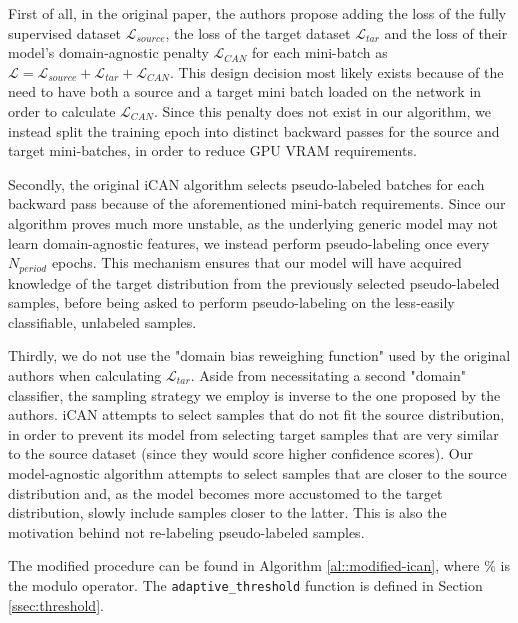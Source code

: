 \documentclass[12pt, a4paper]{article}
\newcommand{\loss}{\mathcal{L}}
\begin{document}
	First of all, in the original paper, the authors propose adding the loss of the fully supervised dataset $\loss_{source}$, the loss of the target dataset $\loss_{tar}$ and the loss of their model's domain-agnostic penalty $\loss_{CAN}$ for each mini-batch as $\loss = \loss_{source} + \loss_{tar} + \loss_{CAN}$. This design decision most likely exists because of the need to have both a source and a target mini batch loaded on the network in order to calculate $\loss_{CAN}$. Since this penalty does not exist in our algorithm, we instead split the training epoch into distinct backward passes for the source and target mini-batches, in order to reduce GPU VRAM requirements.
	
	Secondly, the original iCAN algorithm selects pseudo-labeled batches for each backward pass because of the aforementioned mini-batch requirements. Since our algorithm proves much more unstable, as the underlying generic model may not learn domain-agnostic features, we instead perform pseudo-labeling once every $N_{period}$ epochs. This mechanism ensures that our model will have acquired knowledge of the target distribution from the previously selected pseudo-labeled samples, before being asked to perform pseudo-labeling on the less-easily classifiable, unlabeled samples.
	
	Thirdly, we do not use the "domain bias reweighing function" used by the original authors when calculating $\loss_{tar}$. Aside from necessitating a second "domain" classifier, the sampling strategy we employ is inverse to the one proposed by the authors. iCAN attempts to select samples that do not fit the source distribution, in order to prevent its model from selecting target samples that are very similar to the source dataset (since they would score higher confidence scores). Our model-agnostic algorithm attempts to select samples that are closer to the source distribution and, as the model becomes more accustomed to the target distribution, slowly include samples closer to the latter. This is also the motivation behind not re-labeling pseudo-labeled samples.
		
	The modified procedure can be found in Algorithm \ref{al::modified-ican}, where $\%$ is the modulo operator. The \texttt{adaptive\_threshold} function is defined in Section \ref{ssec:threshold}.
	
\end{document}
